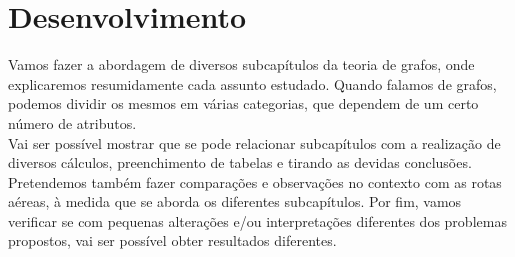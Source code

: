 

\chapter{Desenvolvimento}
\label{chapter:desenvolvimento}
Vamos fazer a abordagem de diversos subcapítulos da teoria de grafos, onde explicaremos resumidamente cada assunto estudado. Quando falamos de grafos, podemos dividir os mesmos em várias categorias, que dependem de um certo número de atributos.\\
Vai ser possível mostrar que se pode relacionar subcapítulos com a realização de diversos cálculos, preenchimento de tabelas e tirando as devidas conclusões. \\
Pretendemos também fazer comparações e observações no contexto com as rotas aéreas, à medida que se aborda os diferentes subcapítulos. Por fim, vamos verificar se com pequenas alterações e/ou interpretações diferentes dos problemas propostos, vai ser possível obter resultados diferentes.